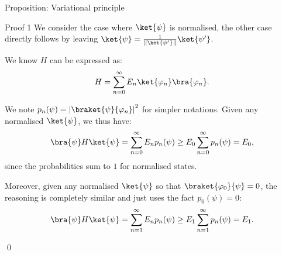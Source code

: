 \documentclass[a4paper]{article}
\begin{document}
\begin{parag}{Proposition: Variational principle}
    \begin{subparag}{Proof 1}
        We consider the case where $\ket{\psi}$ is normalised, the other case directly follows by leaving $\ket{\psi} = \frac{1}{\left\|\ket{\psi'}\right\|} \ket{\psi'}$.

        We know $H$ can be expressed as: 
        \[H = \sum_{n=0}^{\infty} E_n \ket{\phi_n} \bra{\phi_n}.\]

        We note $p_n\left(\psi\right) = \left|\braket{\psi}{\phi_n}\right|^2$ for simpler notations. Given any normalised $\ket{\psi}$, we thus have:
        \[\bra{\psi}H \ket{\psi} = \sum_{n=0}^{\infty} E_n p_n\left(\psi\right) \geq E_0 \sum_{n=0}^{\infty} p_n\left(\psi\right) = E_0,\]
        since the probabilities sum to $1$ for normalised states.

        Moreover, given any normalised $\ket{\psi}$ so that $\braket{\phi_0}{\psi} = 0$, the reasoning is completely similar and just uses the fact $p_0\left(\psi\right) = 0$: 
        \[\bra{\psi}H \ket{\psi} = \sum_{n=1}^{\infty} E_n p_n\left(\psi\right) \geq E_1 \sum_{n=1}^{\infty} p_n\left(\psi\right) = E_1.\]
        
        \qed
    \end{subparag}
\end{parag}
\end{document}
